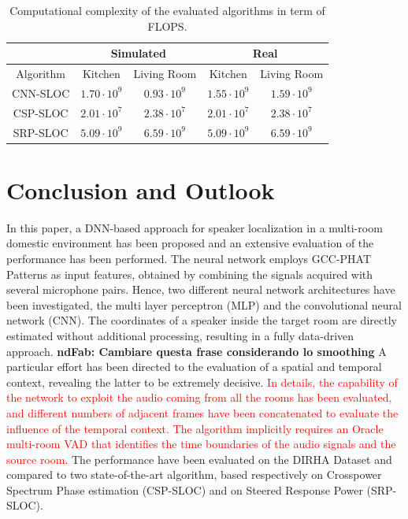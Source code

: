 \documentclass[review]{elsarticle}
\begin{document}
\begin{table}[t]
\centering
\caption{Computational complexity of the evaluated algorithms in term of FLOPS.}\label{tab:comp_cost}
\begin{tabular}{c | c | c | c | c}
\hline
 & \multicolumn{2}{c|}{Simulated} & \multicolumn{2}{c}{Real} \\
\hline
Algorithm          &  Kitchen & Living Room & Kitchen & Living Room \\
\hline
CNN-SLOC & $1.70 \cdot 10^9$  &   $0.93 \cdot 10^9$  & $1.55  \cdot 10^9$    & $1.59\cdot 10^9$     \\
CSP-SLOC  &  $2.01 \cdot 10^7$  & $2.38 \cdot 10^7$ &   $2.01 \cdot 10^7$        &  $2.38 \cdot 10^7$    \\
SRP-SLOC & $5.09 \cdot 10^9$  & $6.59 \cdot 10^9 $ &  $5.09 \cdot 10^9$ &  $6.59 \cdot 10^9 $ \\    \hline
\end{tabular}
\end{table}


\section{Conclusion and Outlook}
\label{sec:concl}

In this paper, a DNN-based approach for speaker localization in a multi-room domestic environment has been proposed and an extensive evaluation of the performance has been performed. The neural network employs GCC-PHAT Patterns as input features, obtained by combining the signals acquired with several microphone pairs. Hence, two different neural network architectures have been investigated, the multi layer perceptron (MLP) and the convolutional neural network (CNN). The coordinates of a speaker inside the target room are directly estimated without additional processing, resulting in a fully data-driven approach. \textbf{ndFab: Cambiare questa frase considerando lo smoothing}
A particular effort has been directed to the evaluation of a spatial and temporal context, revealing the latter to be extremely decisive. \textcolor{red}{In details, the capability of the network to exploit the audio coming from all the rooms has been evaluated, and different numbers of adjacent frames have been concatenated to evaluate the influence of the temporal context.}
\textcolor{red}{The algorithm implicitly requires an Oracle multi-room VAD that identifies the time boundaries of the audio signals and the source room.} The performance have been evaluated on the DIRHA Dataset and compared to two state-of-the-art algorithm, based respectively on Crosspower Spectrum Phase estimation (CSP-SLOC) and on Steered Response Power (SRP-SLOC).
\end{document}
